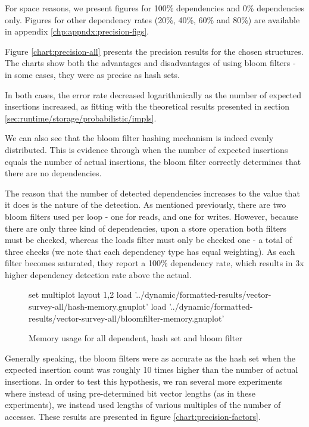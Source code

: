 For space reasons, we present figures for 100\% dependencies and 0\% dependencies only. Figures for other dependency rates (20\%, 40\%, 60\% and 80\%) are available in appendix \ref{chp:appndx:precision-figs}.

Figure \ref{chart:precision-all} presents the precision results for the chosen structures. The charts show both the advantages and disadvantages of using bloom filters - in some cases, they were as precise as hash sets.

In both cases, the error rate decreased logarithmically as the number of expected insertions increased, as fitting with the theoretical results presented in section \ref{sec:runtime/storage/probabilistic/impls}.

We can also see that the bloom filter hashing mechanism is indeed evenly distributed. This is evidence through when the number of expected insertions equals the number of actual insertions, the bloom filter correctly determines that there are no dependencies.

The reason that the number of detected dependencies increases to the value that it does is the nature of the detection. As mentioned previously, there are two bloom filters used per loop - one for reads, and one for writes. However, because there are only three kind of dependencies, upon a store operation both filters must be checked, whereas the loads filter must only be checked one - a total of three checks (we note that each dependency type has equal weighting). As each filter becomes saturated, they report a 100\% dependency rate, which results in 3x higher dependency detection rate above the actual.

\begin{figure}
	\centering
	\begin{gnuplot}[terminal=pdf]
		set multiplot layout 1,2
			load '../dynamic/formatted-results/vector-survey-all/hash-memory.gnuplot'
			load '../dynamic/formatted-results/vector-survey-all/bloomfilter-memory.gnuplot'
	\end{gnuplot}
	\caption{Memory usage for all dependent, hash set and bloom filter}
	\label{chart:mem-hashbloom-all}
\end{figure}

Generally speaking, the bloom filters were as accurate as the hash set when the expected insertion count was roughly 10 times higher than the number of actual insertions. In order to test this hypothesis, we ran several more experiments where instead of using pre-determined bit vector lengths (as in these experiments), we instead used lengths of various multiples of the number of accesses. These results are presented in figure \ref{chart:precision-factors}.

